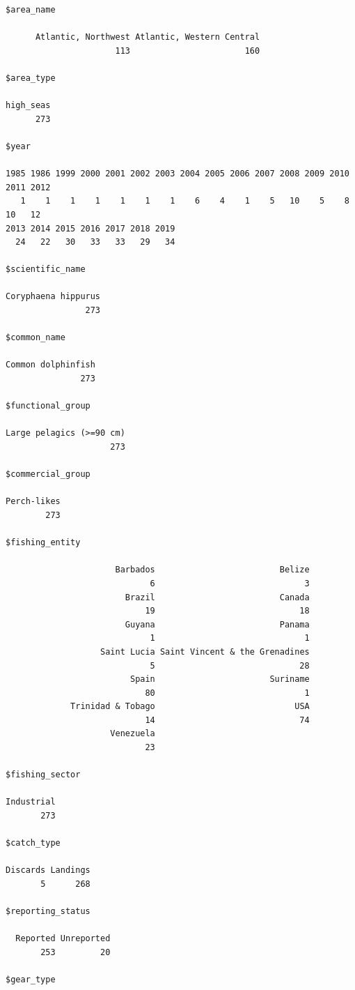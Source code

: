\documentclass[
]{article}
\begin{document}
\begin{verbatim}
$area_name

      Atlantic, Northwest Atlantic, Western Central 
                      113                       160 

$area_type

high_seas 
      273 

$year

1985 1986 1999 2000 2001 2002 2003 2004 2005 2006 2007 2008 2009 2010 2011 2012 
   1    1    1    1    1    1    1    6    4    1    5   10    5    8   10   12 
2013 2014 2015 2016 2017 2018 2019 
  24   22   30   33   33   29   34 

$scientific_name

Coryphaena hippurus 
                273 

$common_name

Common dolphinfish 
               273 

$functional_group

Large pelagics (>=90 cm) 
                     273 

$commercial_group

Perch-likes 
        273 

$fishing_entity

                      Barbados                         Belize 
                             6                              3 
                        Brazil                         Canada 
                            19                             18 
                        Guyana                         Panama 
                             1                              1 
                   Saint Lucia Saint Vincent & the Grenadines 
                             5                             28 
                         Spain                       Suriname 
                            80                              1 
             Trinidad & Tobago                            USA 
                            14                             74 
                     Venezuela 
                            23 

$fishing_sector

Industrial 
       273 

$catch_type

Discards Landings 
       5      268 

$reporting_status

  Reported Unreported 
       253         20 

$gear_type


\end{verbatim}
\end{document}

